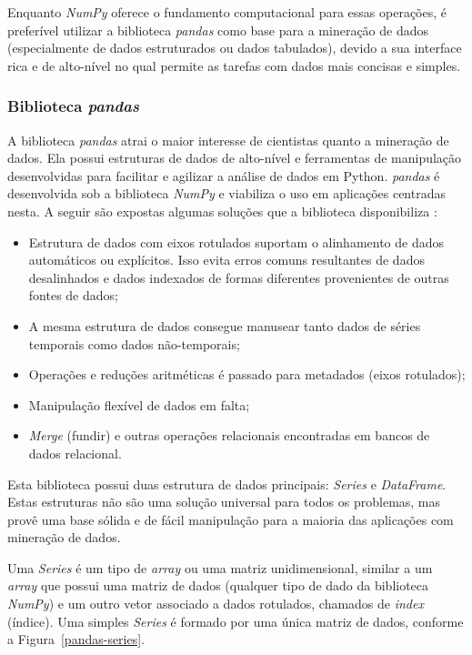 Enquanto \textit{NumPy} oferece o fundamento computacional para essas operações, é preferível utilizar a biblioteca \textit{pandas} como base para a mineração de dados (especialmente de dados estruturados ou dados tabulados), devido a sua interface rica e de alto-nível no qual permite as tarefas com dados mais concisas e simples.

\subsubsection{Biblioteca \textit{pandas}}\label{pandas}
A biblioteca \textit{pandas} atrai o maior interesse de cientistas quanto a mineração de dados. Ela possui estruturas de dados de alto-nível e ferramentas de manipulação desenvolvidas para facilitar e agilizar a análise de dados em Python. \textit{pandas} é desenvolvida sob a biblioteca \textit{NumPy} e viabiliza o uso em aplicações centradas nesta. A seguir são expostas algumas soluções que a biblioteca disponibiliza \cite{python-analysis}:

\begin{itemize}
    \item Estrutura de dados com eixos rotulados suportam o alinhamento de dados automáticos ou explícitos. Isso evita erros comuns resultantes de dados desalinhados e dados indexados de formas diferentes provenientes de outras fontes de dados;
    \item A mesma estrutura de dados consegue manusear tanto dados de séries temporais como dados não-temporais;
    \item Operações e reduções aritméticas é passado para metadados (eixos rotulados);
    \item Manipulação flexível de dados em falta;
    \item \textit{Merge} (fundir) e outras operações relacionais encontradas em bancos de dados relacional.
\end{itemize}

Esta biblioteca possui duas estrutura de dados principais: \textit{Series} e \textit{DataFrame}. Estas estruturas não são uma solução universal para todos os problemas, mas provê uma base sólida e de fácil manipulação para a maioria das aplicações com mineração de dados.

Uma \textit{Series} é um tipo de \textit{array} ou uma matriz unidimensional, similar a um \textit{array} que possui uma matriz de dados (qualquer tipo de dado da biblioteca \textit{NumPy}) e um outro vetor associado a dados rotulados, chamados de \textit{index} (índice). Uma simples \textit{Series} é formado por uma única matriz de dados, conforme a Figura~\ref{pandas-series}.

